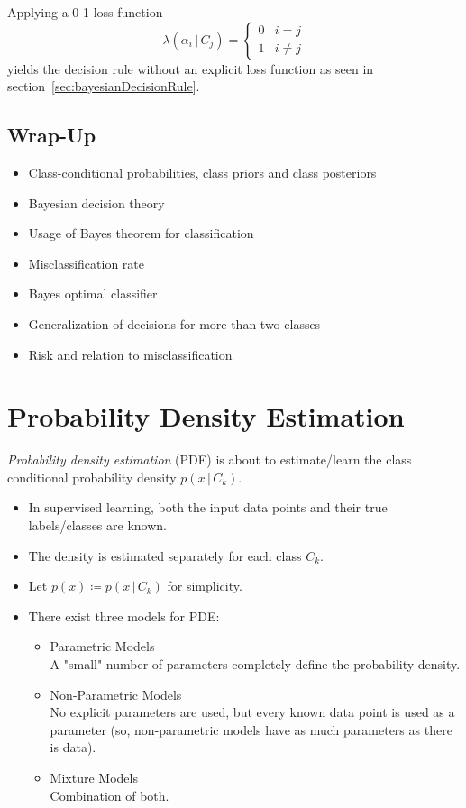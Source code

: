 \documentclass[a4paper, 11pt, accentcolor = tud3b]{tudreport}
\newcommand{\given}{\ensuremath{\,\vert\,}}
\begin{document}
				Applying a 0-1 loss function
				\begin{equation}
					\lambda(\alpha_i \given C_j) =
						\begin{cases}
							0 & i = j \\
							1 & i \neq j
						\end{cases}
				\end{equation}
				yields the decision rule without an explicit loss function as seen in section~\ref{sec:bayesianDecisionRule}.
		
		\section{Wrap-Up}
			\begin{itemize}
				\item Class-conditional probabilities, class priors and class posteriors
				\item Bayesian decision theory
				\item Usage of Bayes theorem for classification
				\item Misclassification rate
				\item Bayes optimal classifier
				\item Generalization of decisions for more than two classes
				\item Risk and relation to misclassification
			\end{itemize}

	\chapter{Probability Density Estimation}
		\emph{Probability density estimation} (PDE) is about to estimate/learn the class conditional probability density \( p(x \given C_k) \).

		\begin{itemize}
			\item In supervised learning, both the input data points and their true labels/classes are known.
			\item The density is estimated separately for each class \(C_k\).
			\item Let \( p(x) \coloneqq p(x \given C_k) \) for simplicity.
			\item There exist three models for PDE:
				\begin{itemize}
					\item Parametric Models \\ A "small" number of parameters completely define the probability density.
					\item Non-Parametric Models \\ No explicit parameters are used, but every known data point is used as a parameter (so, non-parametric models have as much parameters as there is data).
					\item Mixture Models \\ Combination of both.
				\end{itemize}
		\end{itemize}
\end{document}
